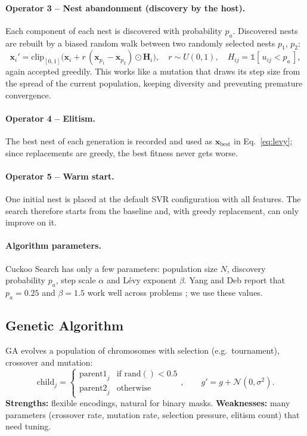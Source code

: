 \documentclass[12pt,a4paper]{article}
\numberwithin{equation}{section}
\numberwithin{table}{section}
\numberwithin{figure}{section}
\begin{document}
\paragraph{Operator 3 -- Nest abandonment (discovery by the host).} Each component of each nest is discovered with probability $p_a$. Discovered nests are rebuilt by a biased random walk between two randomly selected nests $p_1$, $p_2$:
\begin{equation}
  \mathbf{x}_i' = \mathrm{clip}_{[0,1]}\big( \mathbf{x}_i + r \, (\mathbf{x}_{p_1} - \mathbf{x}_{p_2}) \odot \mathbf{H}_i \big), \quad r \sim U(0,1), \quad H_{ij} = \mathbb{1}[\,u_{ij} < p_a\,],
\end{equation}
again accepted greedily. This works like a mutation that draws its step size from the spread of the current population, keeping diversity and preventing premature convergence.

\paragraph{Operator 4 -- Elitism.} The best nest of each generation is recorded and used as $\mathbf{x}_{\text{best}}$ in Eq.~\eqref{eq:levy}; since replacements are greedy, the best fitness never gets worse.

\paragraph{Operator 5 -- Warm start.} One initial nest is placed at the default SVR configuration with all features. The search therefore starts from the baseline and, with greedy replacement, can only improve on it.

\paragraph{Algorithm parameters.} Cuckoo Search has only a few parameters: population size $N$, discovery probability $p_a$, step scale $\alpha$ and Lévy exponent $\beta$. Yang and Deb report that $p_a = 0.25$ and $\beta = 1.5$ work well across problems \cite{yang2009,yang2010eng}; we use these values.

\subsection{Genetic Algorithm}
GA \cite{holland1975} evolves a population of chromosomes with selection (e.g.\ tournament), crossover and mutation:
\begin{equation}
  \text{child}_j = \begin{cases} \text{parent1}_j & \text{if } \mathrm{rand}() < 0.5 \\ \text{parent2}_j & \text{otherwise} \end{cases}, \qquad g' = g + \mathcal{N}(0, \sigma^2).
\end{equation}
\textbf{Strengths:} flexible encodings, natural for binary masks. \textbf{Weaknesses:} many parameters (crossover rate, mutation rate, selection pressure, elitism count) that need tuning.
\end{document}
